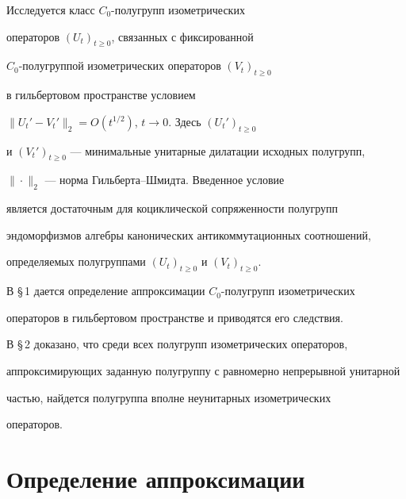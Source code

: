 \date{}




\pagestyle{plain} %







\maketitle


\label{begin}








Исследуется класс $C_0$-полугрупп изометрических


операторов $(U_t)_{t\geq 0}$, связанных с фиксированной


$C_0$-полугруппой изометрических операторов $(V_t)_{t\geq 0}$


в гильбертовом пространстве условием


$\|U_t'-V_t'\|_2=O(t^{1/2})$, $t\to 0$. Здесь $(U_t')_{t\geq 0}$


и $(V_t')_{t\geq 0}$ --- минимальные унитарные дилатации исходных полугрупп,


$\|\cdot \|_2$ --- норма Гильберта--Шмидта. Введенное условие


является достаточным для коциклической сопряженности полугрупп


эндоморфизмов алгебры канонических антикоммутационных соотношений,


определяемых полугруппами $(U_t)_{t\geq 0}$ и $(V_t)_{t\geq 0}$.


В \S\,1 дается определение аппроксимации $C_0$-полугрупп изометрических


операторов в гильбертовом пространстве и приводятся его следствия.


В \S\,2 доказано, что среди всех полугрупп изометрических операторов,


аппроксимирующих заданную полугруппу с равномерно непрерывной унитарной


частью, найдется полугруппа вполне неунитарных изометрических


операторов.





\section{Определение аппроксимации}





